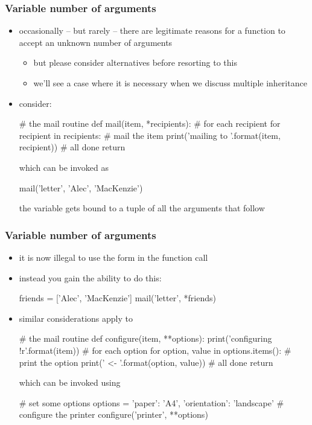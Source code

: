 \begin{frame}[fragile]
%
  \frametitle{Variable number of arguments}
%
  \begin{itemize}
%
  \item occasionally -- but rarely -- there are legitimate reasons for a function to accept an
    unknown number of arguments
    \begin{itemize}
    \item but please consider alternatives before resorting to this
    \item we'll see a case where it is necessary when we discuss multiple inheritance
    \end{itemize}
%
  \item consider:
    \begin{ipython}{}
      # the mail routine
      def mail(item, *recipients):
          # for each recipient
          for recipient in recipients:
              # mail the item
              print('mailing {} to {}'.format(item, recipient))
          # all done
          return
    \end{ipython}
    which can be invoked as
    \begin{ipython}{}
      mail('letter', 'Alec', 'MacKenzie')
    \end{ipython}
    the variable  gets bound to a tuple of all the arguments that follow
%
  \end{itemize}
%
\end{frame}

\begin{frame}[fragile]
%
  \frametitle{Variable number of arguments}
%
  \begin{itemize}
%
  \item it is now illegal to use the form  in the function
    call
%
  \item instead you gain the ability to do this:
    \begin{ipython}{}
      friends = ['Alec', 'MacKenzie']
      mail('letter', *friends)
    \end{ipython}
%
  \item similar considerations apply to
    \begin{ipython}{}
      # the mail routine
      def configure(item, **options):
          print('configuring {!r}'.format(item))
          # for each option
          for option, value in options.items():
              # print the option
              print('  {} <- {}'.format(option, value))
          # all done
          return
    \end{ipython}
    which can be invoked using
    \begin{ipython}{}
      # set some options
      options = {
          'paper': 'A4',
          'orientation': 'landscape'
          }
      # configure the printer
      configure('printer', **options)
    \end{ipython}
%
  \end{itemize}
%
\end{frame}


